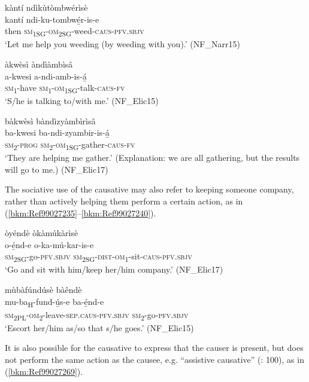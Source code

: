\ea
\label{bkm:Ref98512745}
kàntí ndìkùtòmbwérìsè\\
\gll kantí  ndi-ku-tombwé̲r-is-e\\
then  \textsc{sm}\textsubscript{1SG}-\textsc{om}\textsubscript{2SG}-weed-\textsc{caus}-\textsc{pfv}.\textsc{sbjv}\\
\glt ‘Let me help you weeding (by weeding with you).’ (NF\_Narr15)
\z

\ea
àkwèsì àndìàmbìsâ\\
\gll a-kwesi  a-ndi-amb-is-á̲\\
\textsc{sm}\textsubscript{1}-have  \textsc{sm}\textsubscript{1}-\textsc{om}\textsubscript{1SG}-talk-\textsc{caus}-\textsc{fv}\\
\glt ‘S/he is talking to/with me.’ (NF\_Elic15)
\z

\ea
\label{bkm:Ref98512746}
bàkwèsì bàndìzyàmbìrìsâ\\
\gll ba-kwesi  ba-ndi-zyambir-is-á̲\\
\textsc{sm}\textsubscript{2}-\textsc{prog}  \textsc{sm}\textsubscript{2}-\textsc{om}\textsubscript{1SG}-gather-\textsc{caus}-\textsc{fv}\\
\glt ‘They are helping me gather.’ (Explanation: we are all gathering, but the results will go to me.) (NF\_Elic17)
\z

The sociative use of the causative may also refer to keeping someone company, rather than actively helping them perform a certain action, as in (\ref{bkm:Ref99027235}--\ref{bkm:Ref99027240}).

\ea
\label{bkm:Ref99027235}
òyéndè òkàmúkàrìsè\\
\gll o-é̲nd-e    o-ka-mú-kar-is-e\\
\textsc{sm}\textsubscript{2SG}-go-\textsc{pfv}.\textsc{sbjv}  \textsc{sm}\textsubscript{2SG}-\textsc{dist}-\textsc{om}\textsubscript{1}-sit-\textsc{caus}-\textsc{pfv}.\textsc{sbjv}\\
\glt ‘Go and sit with him/keep her/him company.’ (NF\_Elic17)
\z

\ea
\label{bkm:Ref99027240}
mùbàfúndúsè bàêndè\\
\gll mu-ba\textsubscript{H}-fund-ú̲s-e        ba-é̲nd-e\\
\textsc{sm}\textsubscript{2PL}-\textsc{om}\textsubscript{2}-leave-\textsc{sep}.\textsc{caus}-\textsc{pfv}.\textsc{sbjv}  \textsc{sm}\textsubscript{2}-go-\textsc{pfv}.\textsc{sbjv}\\
\glt ‘Escort her/him as/so that s/he goes.’ (NF\_Elic15)
\z

It is also possible for the causative to express that the causer is present, but does not perform the same action as the causee, e.g. “assistive causative” (\citealt{ShibataniPardeshi2001}: 100), as in (\ref{bkm:Ref99027269}).

